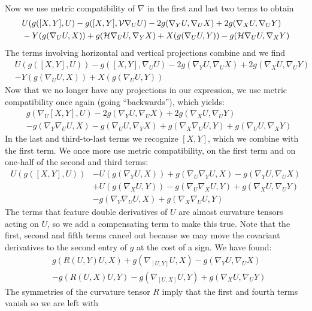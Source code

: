 \begin{myproof}
\begin{numberedlist}
\begin{align*}
		\end{align*}
		Now we use metric compatibility of $\nabla$ in the first and last two terms to obtain
		\begin{align*}
			&U(g([X,Y],U)-g([X,Y],\mathcal{V}\nabla_U U)
			-2g(\nabla_Y U,\nabla_UX)+2g(\nabla_XU,\nabla_UY)\\
			&-Y(g(\nabla_U U,X))+g(\mathcal{H}\nabla_U U,\nabla_YX)
			+X(g(\nabla_UU,Y))-g(\mathcal{H}\nabla_U U,\nabla_XY)
		\end{align*}
		The terms involving horizontal and vertical projections combine and we find
		\begin{align*}
			&U(g([X,Y],U))-g([X,Y],\nabla_U U)
			-2g(\nabla_Y U,\nabla_UX)+2g(\nabla_XU,\nabla_UY)\\
			&-Y(g(\nabla_U U,X))+X(g(\nabla_UU,Y))
		\end{align*}
		Now that we no longer have any projections in our expression, we use metric compatibility once again (going ``backwards''), which yields:
		\begin{align*}
			&g(\nabla_U[X,Y],U)-2g(\nabla_Y U,\nabla_UX)+2g(\nabla_XU,\nabla_UY)\\
			&-g(\nabla_Y\nabla_U U,X)-g(\nabla_U U,\nabla_Y X)
			+g(\nabla_X\nabla_UU,Y)+g(\nabla_UU,\nabla_XY)
		\end{align*}
		In the last and third-to-last terms we recognize $[X,Y]$, which we combine with the first term. We once more use metric compatibility, on the first term and on one-half of the second and third terms:
		\begin{align*}
			U(g([X,Y],U)) & -U(g(\nabla_YU,X))+g(\nabla_U\nabla_YU,X)
			-g(\nabla_YU,\nabla_U X)\\
			&+U(g(\nabla_XU,Y))-g(\nabla_U\nabla_XU,Y)
			+g(\nabla_XU,\nabla_U Y)\\
			&-g(\nabla_Y\nabla_U U,X) +g(\nabla_X\nabla_U U,Y)
		\end{align*}
		The terms that feature double derivatives of $U$ are almost curvature tensors acting on $U$, so we add a compensating term to make this true. Note that the first, second and fifth terms cancel out because we may move the covariant derivatives to the second entry of $g$ at the cost of a sign. We have found:
		\begin{align*}
			&g(R(U,Y)U,X)+g(\nabla_{[U,Y]}U,X)-g(\nabla_YU, \nabla_UX)\\
			&-g(R(U,X)U,Y)-g(\nabla_{[U,X]}U,Y)+g(\nabla_XU,\nabla_UY)
		\end{align*}
		The symmetries of the curvature tensor $R$ imply that the first and fourth terms vanish so we are left with

\end{numberedlist}
\end{myproof}
